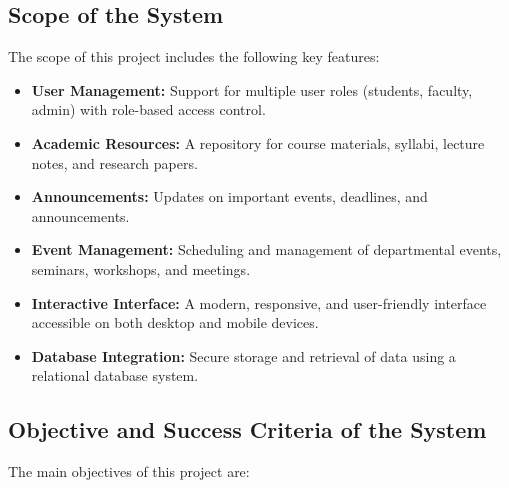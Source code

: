\documentclass[11pt]{article}
\begin{document}
\subsection{Scope of the System}
The scope of this project includes the following key features:

\begin{itemize}
    \item \textbf{User Management:} Support for multiple user roles (students, faculty, admin) with role-based access control.
    \item \textbf{Academic Resources:} A repository for course materials, syllabi, lecture notes, and research papers.
    \item \textbf{Announcements:} Updates on important events, deadlines, and announcements.
    \item \textbf{Event Management:} Scheduling and management of departmental events, seminars, workshops, and meetings.
    \item \textbf{Interactive Interface:} A modern, responsive, and user-friendly interface accessible on both desktop and mobile devices.
    \item \textbf{Database Integration:} Secure storage and retrieval of data using a relational database system.
\end{itemize}

\subsection{Objective and Success Criteria of the System}
The main objectives of this project are:
\end{document}
